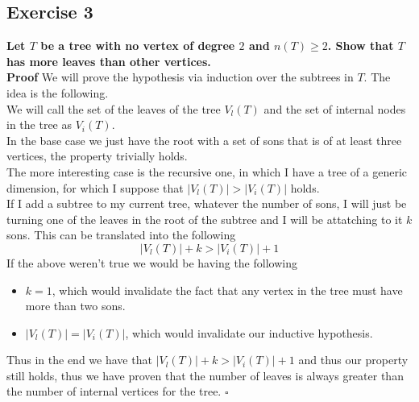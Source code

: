\subsection*{Exercise 3}
\boldmath 
\textbf{Let $T$ be a tree with no vertex of degree $2$ and $n(T) \geq 2$. Show that $T$ has more leaves than
other vertices.}
\unboldmath 
\\ 
\linebreak 
\textbf{Proof}
We will prove the hypothesis via induction over the subtrees in $T$. The idea is the following.\\ 
\linebreak 
We will call the set of the leaves of the tree $V_l(T)$ and the set of internal nodes in the tree as
$V_i(T)$.\\ 
\linebreak 
In the base case we just have the root with a set of sons that is of at least three vertices, the
property trivially holds.\\
\linebreak
The more interesting case is the recursive one, in which I have a tree of a generic dimension, for
which I suppose that $|V_l(T)| > |V_i(T)|$ holds.\\
If I add a subtree to my current tree, whatever the number of sons, I will just be turning one of
the leaves in the root of the subtree and I will be attatching to it $k$ sons. This can be
translated into the following
\begin{equation}
    |V_l(T)| + k > |V_i(T)| + 1
\end{equation}
If the above weren't true we would be having the following
\begin{itemize}
    \item $k = 1$, which would invalidate the fact that any vertex in the tree must have more than two
    sons.
    \item $|V_l(T)| = |V_i(T)|$, which would invalidate our inductive hypothesis.
\end{itemize}
Thus in the end we have that $|V_l(T)| + k > |V_i(T)| + 1$ and thus our property still holds, thus
we have proven that the number of leaves is always greater than the number of internal vertices for
the tree. \hspace{10mm} $\square$
